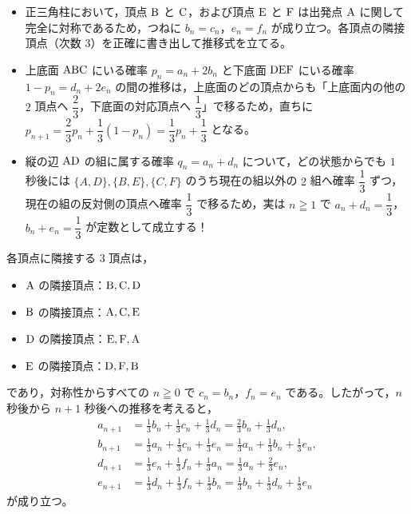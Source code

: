 

\begin{itemize}[leftmargin=1.6em,itemsep=2pt,topsep=2pt]
  \item[(1)] 正三角柱において，頂点 $\mathrm{B}$ と $\mathrm{C}$，および頂点 $\mathrm{E}$ と $\mathrm{F}$ は出発点 $\mathrm{A}$ に関して完全に対称であるため，つねに $b_{n}=c_{n}$，$e_{n}=f_{n}$ が成り立つ。各頂点の隣接頂点（次数 $3$）を正確に書き出して推移式を立てる。
  \item[(2)] 上底面 $\mathrm{ABC}$ にいる確率 $p_{n}=a_{n}+2b_{n}$ と下底面 $\mathrm{DEF}$ にいる確率 $1-p_{n}=d_{n}+2e_{n}$ の間の推移は，上底面のどの頂点からも「上底面内の他の $2$ 頂点へ $\dfrac{2}{3}$，下底面の対応頂点へ $\dfrac{1}{3}$」で移るため，直ちに $p_{n+1}=\dfrac{2}{3}p_{n}+\dfrac{1}{3}(1-p_{n})=\dfrac{1}{3}p_{n}+\dfrac{1}{3}$ となる。
  \item[(3)] 縦の辺 $\mathrm{AD}$ の組に属する確率 $q_{n}=a_{n}+d_{n}$ について，どの状態からでも $1$ 秒後には $\{A,D\},\{B,E\},\{C,F\}$ のうち現在の組以外の $2$ 組へ確率 $\dfrac{1}{3}$ ずつ，現在の組の反対側の頂点へ確率 $\dfrac{1}{3}$ で移るため，実は $n\geqq 1$ で $a_{n}+d_{n}=\dfrac{1}{3}$，$b_{n}+e_{n}=\dfrac{1}{3}$ が定数として成立する！
\end{itemize}

各頂点に隣接する $3$ 頂点は，
\begin{itemize}[leftmargin=1.6em,itemsep=1pt]
  \item $\mathrm{A}$ の隣接頂点：$\mathrm{B}, \mathrm{C}, \mathrm{D}$
  \item $\mathrm{B}$ の隣接頂点：$\mathrm{A}, \mathrm{C}, \mathrm{E}$
  \item $\mathrm{D}$ の隣接頂点：$\mathrm{E}, \mathrm{F}, \mathrm{A}$
  \item $\mathrm{E}$ の隣接頂点：$\mathrm{D}, \mathrm{F}, \mathrm{B}$
\end{itemize}
であり，対称性からすべての $n\geqq 0$ で $c_{n}=b_{n}$，$f_{n}=e_{n}$ である。したがって，$n$ 秒後から $n+1$ 秒後への推移を考えると，
\begin{align*}
  a_{n+1} &= \frac{1}{3}b_{n} + \frac{1}{3}c_{n} + \frac{1}{3}d_{n} = \frac{2}{3}b_{n} + \frac{1}{3}d_{n},\\
  b_{n+1} &= \frac{1}{3}a_{n} + \frac{1}{3}c_{n} + \frac{1}{3}e_{n} = \frac{1}{3}a_{n} + \frac{1}{3}b_{n} + \frac{1}{3}e_{n},\\
  d_{n+1} &= \frac{1}{3}e_{n} + \frac{1}{3}f_{n} + \frac{1}{3}a_{n} = \frac{1}{3}a_{n} + \frac{2}{3}e_{n},\\
  e_{n+1} &= \frac{1}{3}d_{n} + \frac{1}{3}f_{n} + \frac{1}{3}b_{n} = \frac{1}{3}b_{n} + \frac{1}{3}d_{n} + \frac{1}{3}e_{n}
\end{align*}
が成り立つ。

